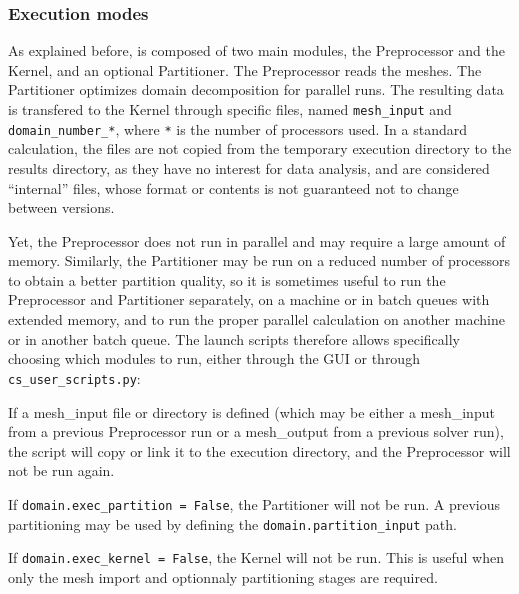 {{{%
\subsubsection{Execution modes}
\label{prg_executionmodes}%
As explained before, \CS is composed of two main modules, the Preprocessor and the
Kernel, and an optional Partitioner. The Preprocessor reads the meshes.
The Partitioner optimizes domain decomposition for parallel runs.
The resulting data is transfered to the Kernel through specific
files, named \texttt{mesh\_input} and \texttt{domain\_number\_*}, where
\texttt{*} is the number of processors used. In a standard calculation, the files
are not copied from the temporary execution directory to the results directory,
as they have no interest for data analysis, and are considered ``internal''
files, whose format or contents is not guaranteed not to change between \CS versions.

Yet, the Preprocessor does not run in parallel and may require a
large amount of memory. Similarly, the Partitioner may be run on a
reduced number of processors to obtain a better partition quality, so it
is sometimes useful to run the Preprocessor and Partitioner
separately, on a machine or in batch queues with extended memory, and to run the
proper parallel calculation on another machine or in another batch
queue. The launch scripts therefore allows specifically choosing
which modules to run, either through the GUI or through \texttt{cs\_user\_scripts.py}:

\sloppy

\hspace*{0.5cm} If a {mesh\_input} file or directory is defined (which may be
either a {mesh\_input} from a previous Preprocessor run or a {mesh\_output}
from a previous solver run), the script will copy or link it to
the execution directory, and the Preprocessor will not be run again.

\hspace*{0.5cm} If \texttt{domain.exec\_partition = False}, the Partitioner
will not be run. A previous partitioning may be used by defining the
\texttt{domain.partition\_input} path.

\hspace*{0.5cm} If \texttt{domain.exec\_kernel = False}, the Kernel will not
be run. This is useful when only the mesh import and optionnaly partitioning
stages are required.

\fussy

}}}
